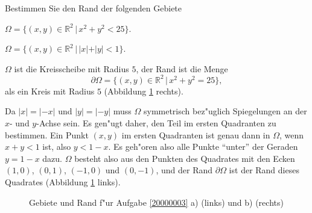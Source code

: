 Bestimmen Sie den Rand der folgenden Gebiete
\begin{teilaufgaben}
\item
$\Omega=\{(x,y)\in\mathbb R^2\,|\, x^2+y^2<25\}$.
\item
$\Omega=\{(x,y)\in\mathbb R^2\,|\, |x|+|y|<1\}$.
\end{teilaufgaben}

\begin{loesung}
\begin{teilaufgaben}
\item
$\Omega$ ist die Kreisscheibe mit Radius $5$, der Rand ist die Menge
\[
\partial\Omega=\{(x,y)\in\mathbb R^2\,|\, x^2+y^2=25\},
\]
als ein Kreis mit Radius $5$ (Abbildung \ref{20000003:fig} rechts).
\item
Da $|x|=|-x|$ und $|y|=|-y|$ muss $\Omega$ symmetrisch bez"uglich
Spiegelungen an der $x$- und $y$-Achse sein. Es gen"ugt daher,
den Teil im ersten Quadranten zu bestimmen.  Ein Punkt $(x,y)$
im ersten Quadranten ist genau dann in $\Omega$, wenn $x+y<1$ ist,
also $y<1-x$. Es geh"oren also alle Punkte ``unter'' der Geraden
$y=1-x$ dazu. $\Omega$ besteht also aus den Punkten des
Quadrates mit den Ecken $(1,0)$, $(0,1)$, $(-1,0)$ und $(0,-1)$,
und der Rand $\partial\Omega$ ist der Rand dieses Quadrates
(Abbildung \ref{20000003:fig} links).
\end{teilaufgaben}
\begin{figure}
\begin{center}
\qquad
{}
\end{center}
\caption{Gebiete und Rand f"ur Aufgabe \ref{20000003} a) (links)
und b) (rechts)\label{20000003:fig}}
\end{figure}
\end{loesung}
